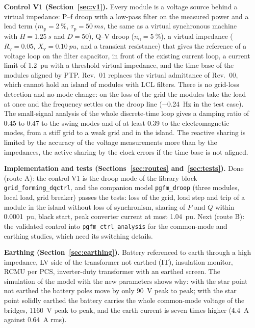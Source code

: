 \documentclass[11pt,a4paper]{scrartcl}
\newcommand{\ped}[1]{_{\mathrm{#1}}}
\newcommand{\code}[1]{\texttt{#1}}
\begin{document}
\begin{onehalfspace}
\begin{mybox}
	\textbf{Control V1 (Section~\ref{sec:v1}).} Every module is a voltage source behind a virtual impedance: P--f droop with a low-pass filter on the measured power and a lead term ($m\ped{p} = \SI{2}{\percent}$, $\tau\ped{p} = \SI{50}{ms}$, the same as a virtual synchronous machine with $H = \SI{1.25}{s}$ and $D = 50$), Q--V droop ($n\ped{q} = \SI{5}{\percent}$), a virtual impedance ($R\ped{v} = 0.05$, $X\ped{v} = \SI{0.10}{pu}$, and a transient resistance) that gives the reference of a voltage loop on the filter capacitor, in front of the existing current loop, a current limit of \SI{1.2}{pu} with a threshold virtual impedance, and the time base of the modules aligned by PTP. Rev.~01 replaces the virtual admittance of Rev.~00, which cannot hold an island of modules with LCL filters. There is no grid-loss detection and no mode change: on the loss of the grid the modules take the load at once and the frequency settles on the droop line (\SI{-0.24}{Hz} in the test case). The small-signal analysis of the whole discrete-time loop gives a damping ratio of 0.45 to 0.47 to the swing modes and of at least 0.39 to the electromagnetic modes, from a stiff grid to a weak grid and in the island. The reactive sharing is limited by the accuracy of the voltage measurements more than by the impedances, the active sharing by the clock errors if the time base is not aligned.

	\textbf{Implementation and tests (Sections~\ref{sec:routes} and~\ref{sec:tests}).} Done (route A): the control V1 is the droop mode of the library block \code{grid\_forming\_dqctrl}, and the companion model \code{pgfm\_droop} (three modules, local load, grid breaker) passes the tests: loss of the grid, load step and trip of a module in the island without loss of synchronism, sharing of $P$ and $Q$ within \SI{0.0001}{pu}, black start, peak converter current at most \SI{1.04}{pu}. Next (route B): the validated control into \code{pgfm\_ctrl\_analysis} for the common-mode and earthing studies, which need its switching details.

	\textbf{Earthing (Section~\ref{sec:earthing}).} Battery referenced to earth through a high impedance, LV side of the transformer not earthed (IT), insulation monitor, RCMU per PCS, inverter-duty transformer with an earthed screen. The simulation of the model with the new parameters shows why: with the star point not earthed the battery poles move by only \SI{90}{V} peak to peak; with the star point solidly earthed the battery carries the whole common-mode voltage of the bridges, \SI{1160}{V} peak to peak, and the earth current is seven times higher (\SI{4.4}{A} against \SI{0.64}{A} rms).
\end{mybox}


\end{onehalfspace}
\end{document}
